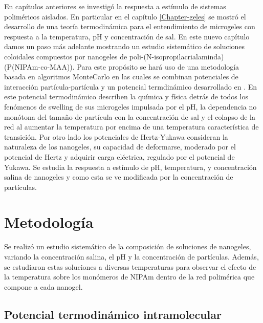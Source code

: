 	En cap\'itulos anteriores se investig\'o la respuesta a est\'imulo de sistemas polim\'ericos aislados. En particular en el cap\'itulo \ref{Chapter-geles} se mostr\'o el desarrollo de una teor\'ia termodin\'amica para el entendimiento de microgeles con respuesta a la temperatura, pH y concentraci\'on de sal. 
	En este nuevo cap\'itulo damos un paso m\'as adelante mostrando un estudio sistem\'atico de soluciones coloidales compuestos por nanogeles de poli-(N-isopropilacrialaminda) (P(NIPAm-co-MAA)). Para este prop\'osito se har\'a uso de una metodolog\'ia basada en algoritmos MonteCarlo en las cuales se combinan potenciales de interacci\'on part\'icula-part\'icula y un potencial termdin\'amico desarrollado en \cite{perez2021thermodynamic}. En este potencial termodin\'amico \citet{perez2021thermodynamic} describen la qu\'imica y f\'isica detr\'as de todos los fen\'omenos de swelling de sus microgeles impulsada por el pH, la dependencia no mon\'otona del tama\~no de part\'icula con la concentraci\'on de sal y el colapso de la red al aumentar la temperatura por encima de una temperatura caracter\'istica de transici\'on.
	Por otro lado los potenciales de Hertz-Yukawa consideran la naturaleza de los nanogeles, su capacidad de deformarse, moderado por el potencial de Hertz y adquirir carga el\'ectrica, regulado por el potencial de Yukawa.
	Se estudia la respuesta a est\'imulo de pH, temperatura, y concentraci\'on salina de nanogeles y como esta se ve modificada por la concentraci\'on de part\'iculas. 

	
	
	
	
	
	\section{Metodolog\'ia}
	
	Se realiz\'o un estudio sistem\'atico de la composici\'on de soluciones de nanogeles, variando la concentraci\'on salina, el pH y la concentraci\'on de part\'iculas. Adem\'as, se estudiaron estas soluciones a diversas temperaturas para observar el efecto de la temperatura sobre los mon\'omeros de NIPAm dentro de la red polim\'erica que compone a cada nanogel.
	
	\subsection{Potencial termodin\'amico intramolecular}
	
